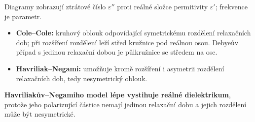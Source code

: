 Diagramy zobrazují ztrátové číslo $\varepsilon''$ proti reálné složce permitivity $\varepsilon'$; frekvence je parametr.
\begin{itemize}
\item \textbf{Cole--Cole:} kruhový oblouk odpovídající symetrickému rozdělení relaxačních dob; při rozšíření rozdělení leží střed kružnice pod reálnou osou. Debyeův případ s jedinou relaxační dobou je půlkružnice se středem na ose.
\item \textbf{Havriliak--Negami:} umožňuje kromě rozšíření i asymetrii rozdělení relaxačních dob, tedy nesymetrický oblouk.
\end{itemize}
\textbf{Havriliakův--Negamiho model lépe vystihuje reálné dielektrikum}, protože jeho polarizující částice nemají jedinou relaxační dobu a jejich rozdělení může být nesymetrické.
